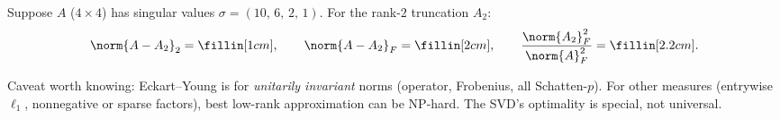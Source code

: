 \begin{yourturn}
Suppose $A$ ($4\times4$) has singular values $\sigma=(10,\,6,\,2,\,1)$. For the rank-$2$
truncation $A_2$:
\[
  \norm{A-A_2}_2=\fillin[1cm],\qquad
  \norm{A-A_2}_F=\fillin[2cm],\qquad
  \frac{\norm{A_2}_F^2}{\norm{A}_F^2}=\fillin[2.2cm].
\]
\end{yourturn}

\begin{strand}
Caveat worth knowing: Eckart--Young is for \emph{unitarily invariant} norms (operator, Frobenius,
all Schatten-$p$). For other measures (entrywise $\ell_1$, nonnegative or sparse factors), best
low-rank approximation can be NP-hard. The SVD's optimality is special, not universal.
\end{strand}
